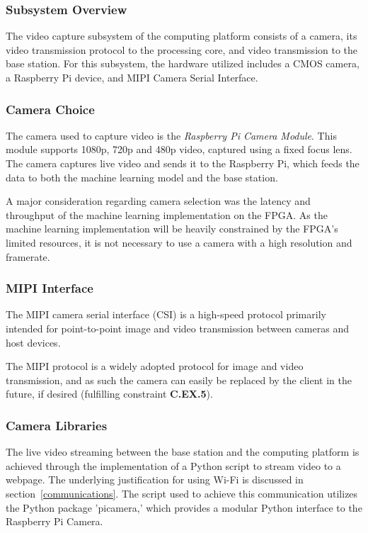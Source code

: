 
\subsubsection{Subsystem Overview}
The video capture subsystem of the computing platform consists of a camera, its video transmission protocol to the processing core, and video transmission to the base station. For this subsystem, the hardware utilized includes a CMOS camera, a Raspberry Pi device, and MIPI Camera Serial Interface. 

\subsubsection{Camera Choice}
The camera used to capture video is the \textit{Raspberry Pi Camera Module}. This module supports 1080p, 720p and 480p video, captured using a fixed focus lens. The camera captures live video and sends it to the Raspberry Pi, which feeds the data to both the machine learning model and the base station.

A major consideration regarding camera selection was the latency and throughput of the machine learning implementation on the FPGA. As the machine learning implementation will be heavily constrained by the FPGA's limited resources, it is not necessary to use a camera with a high resolution and framerate.

\subsubsection{MIPI Interface}
The MIPI camera serial interface (CSI) is a high-speed protocol primarily intended for point-to-point image and video transmission between cameras and host devices. 

The MIPI protocol is a widely adopted protocol for image and video transmission, and as such the camera can easily be replaced by the client in the future, if desired (fulfilling constraint \textbf{C.EX.5}).

\subsubsection{Camera Libraries}
The live video streaming between the base station and the computing platform is achieved through the implementation of a Python script to stream video to a webpage. The underlying justification for using Wi-Fi is discussed in section~\ref{communications}. The script used to achieve this communication utilizes the Python package 'picamera,' which provides a modular Python interface to the Raspberry Pi Camera.

